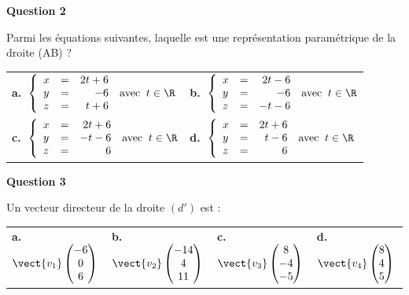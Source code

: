 \medskip

\textbf{Question 2}

Parmi les équations suivantes, laquelle est une représentation paramétrique de la droite (AB) ?

\begin{center}
\begin{tabularx}{\linewidth}{*{2}{X}}
\textbf{a.~}$\left\{\begin{array}{l c r}
x &=& 2t + 6\\
y &=&-6\\
z&=&t+6
\end{array}\right. \:\text{avec }\: t \in \R$&
\textbf{b.~}$\left\{\begin{array}{l c r}
x &=& 2t - 6\\
y &=&- 6\\
z&=&- t - 6
\end{array}\right. \:\text{avec }\: t \in \R$\\
\textbf{c.~}$\left\{\begin{array}{l c r}
x &=& 2t + 6\\
y &=&-t -6\\
z&=&6
\end{array}\right. \:\text{avec }\: t \in \R$&
\textbf{d.~}$\left\{\begin{array}{l c r}
x &=& 2t + 6\\
y &=&t - 6\\
z&=&6
\end{array}\right. \:\text{avec }\: t \in \R$
\end{tabularx}
\end{center}

\medskip

\textbf{Question 3}

Un vecteur directeur de la droite $\left(d'\right)$ est :

\begin{center}
\begin{tabularx}{\linewidth}{*{4}{X}}
\textbf{a.~} $\vect{v_1}\begin{pmatrix}-6\\0\\6\end{pmatrix}$&
\textbf{b.~} $\vect{v_2}\begin{pmatrix}-14\\4\\11\end{pmatrix}$&
\textbf{c.~} $\vect{v_3}\begin{pmatrix}8\\-4\\-5\end{pmatrix}$&
\textbf{d.~} $\vect{v_4}\begin{pmatrix}8\\4\\5\end{pmatrix}$
\end{tabularx}
\end{center}

